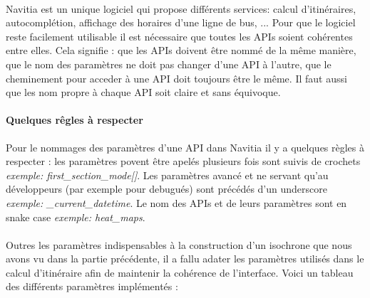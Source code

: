 \documentclass[a4paper]{report}
\begin{document}
\paragraph{} Navitia est un unique logiciel qui propose différents services: calcul d'itinéraires, autocomplétion, affichage des horaires d'une ligne de bus, ... Pour que le logiciel reste facilement utilisable il est nécessaire que toutes les APIs soient cohérentes entre elles. Cela signifie : que les APIs doivent être nommé de la même manière, que le nom des paramètres ne doit pas changer d'une API à l'autre, que le cheminement pour acceder à une API doit toujours être le même. Il faut aussi que les nom propre à chaque API soit claire et sans équivoque. 

\paragraph{Quelques rêgles à respecter} Pour le nommages des paramètres d'une API dans Navitia il y a quelques règles à respecter : les paramètres povent être apelés plusieurs fois sont suivis de crochets \emph{exemple: first\_section\_mode[]}. Les paramètres avancé et ne servant qu'au développeurs (par exemple pour debugués) sont précédés d'un underscore \emph{exemple: \_current\_datetime}. Le nom des APIs et de leurs paramètres sont en snake case \emph{exemple: heat\_maps}.

\paragraph{} Outres les paramètres indispensables à la construction d'un isochrone que nous avons vu dans la partie précédente, il a fallu adater les paramètres utilisés dans le calcul d'itinéraire afin de maintenir la cohérence de l'interface. Voici un tableau des différents paramètres implémentés :
\end{document}
